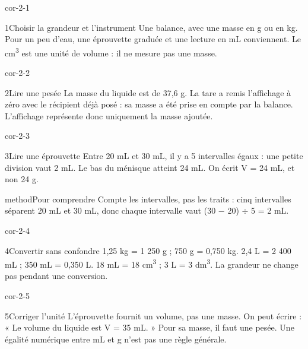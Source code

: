 \documentclass[12pt,twoside,openany]{book}
\begin{document}
\clearpage{}
\begin{blocLivre}{cor-2-1}
\begin{corrige}{1}{Choisir la grandeur et l’instrument}
Une balance, avec une masse en g ou en kg. Pour un peu d’eau, une éprouvette graduée et une lecture en mL conviennent. Le cm\textsuperscript{3} est une unité de volume : il ne mesure pas une masse.\par
\end{corrige}\end{blocLivre}
\begin{blocLivre}{cor-2-2}
\begin{corrige}{2}{Lire une pesée}
La masse du liquide est de 37,6 g. La tare a remis l’affichage à zéro avec le récipient déjà posé : sa masse a été prise en compte par la balance. L’affichage représente donc uniquement la masse ajoutée.\par
\end{corrige}\end{blocLivre}
\begin{blocLivre}{cor-2-3}
\begin{corrige}{3}{Lire une éprouvette}
Entre 20 mL et 30 mL, il y a 5 intervalles égaux : une petite division vaut 2 mL. Le bas du ménisque atteint 24 mL. On écrit V = 24 mL, et non 24 g.\par
\begin{pcEncadre}{method}{Pour comprendre}
Compte les intervalles, pas les traits : cinq intervalles séparent 20 mL et 30 mL, donc chaque intervalle vaut (30 − 20) \(\div\) 5 = 2 mL.\par
\end{pcEncadre}
\end{corrige}\end{blocLivre}
\begin{blocLivre}{cor-2-4}
\begin{corrige}{4}{Convertir sans confondre}
1,25 kg = 1 250 g ; 750 g = 0,750 kg. 2,4 L = 2 400 mL ; 350 mL = 0,350 L. 18 mL = 18 cm\textsuperscript{3} ; 3 L = 3 dm\textsuperscript{3}. La grandeur ne change pas pendant une conversion.\par
\end{corrige}\end{blocLivre}
\begin{blocLivre}{cor-2-5}
\begin{corrige}{5}{Corriger l’unité}
L’éprouvette fournit un volume, pas une masse. On peut écrire : « Le volume du liquide est V = 35 mL. » Pour sa masse, il faut une pesée. Une égalité numérique entre mL et g n’est pas une règle générale.\par
\end{corrige}\end{blocLivre}
\end{document}
